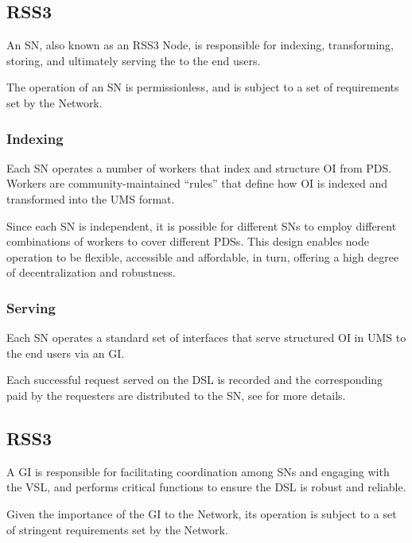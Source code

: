 \subsection{RSS3 }
\label{subsec:SN}

An \gls{SN}, also known as an RSS3 Node, is responsible for indexing, transforming, storing, and ultimately serving the  to the end users.

The operation of an \gls{SN} is permissionless, and is subject to a set of requirements set by the Network.

\subsubsection{Indexing}
Each \gls{SN} operates a number of workers that index and structure \gls{OI} from \gls{PDS}.
Workers are community-maintained ``rules'' that define how \gls{OI} is indexed and transformed into the \gls{UMS} format.

Since each \gls{SN} is independent, it is possible for different \glspl{SN} to employ different combinations of workers to cover different \glspl{PDS}.
This design enables node operation to be flexible, accessible and affordable, in turn, offering a high degree of decentralization and robustness.

\subsubsection{Serving}
Each \gls{SN} operates a standard set of interfaces that serve structured \gls{OI} in \gls{UMS} to the end users via an \gls{GI}.

Each successful request served on the \gls{DSL} is recorded and the corresponding  paid by the requesters are distributed to the \gls{SN}, see  for more details.

\subsection{RSS3 }
\label{subsec:GI}

A \gls{GI} is responsible for facilitating coordination among \glspl{SN} and engaging with the \gls{VSL}, and performs critical functions to ensure the \gls{DSL} is robust and reliable.

Given the importance of the \gls{GI} to the Network, its operation is subject to a set of stringent requirements set by the Network.


